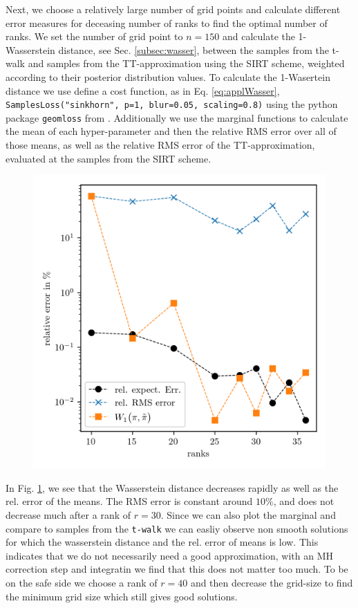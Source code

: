 Next, we choose a relatively large number of grid points and calculate different error measures for deceasing number of ranks to find the optimal number of ranks.
We set the number of grid point to $n = 150$ and calculate the 1-Wasserstein distance, see Sec. \ref{subsec:wasser}, between the samples from the t-walk and samples from the TT-approximation using the SIRT scheme, weighted according to their posterior distribution values.  
To calculate the 1-Wasertein distance we use define a cost function, as in Eq. \ref{eq:applWasser}, \texttt{SamplesLoss("sinkhorn", p=1, blur=0.05, scaling=0.8)} using the python package \texttt{geomloss} from \cite{feydy2020OT}.
Additionally we use the marginal functions to calculate the mean of each hyper-parameter and then the relative RMS error over all of those means, as well as the relative RMS error of the TT-approximation, evaluated at the samples from the SIRT scheme.

\begin{figure}[ht!]%
	\includegraphics[]{findRank.png}
	\caption[Find Ranks]{}
	\label{fig:FindRanks}
\end{figure}
In Fig. \ref{fig:FindRanks}, we see that the Wasserstein distance decreases rapidly as well as the rel. error of the means.
The RMS error is constant around $10\%$, and does not decrease much after a rank of $r = 30$.
Since we can also plot the marginal and compare to samples from the \texttt{t-walk} we can easliy observe non smooth solutions for which the wasserstein distance and the rel. error of means is low.
This indicates that we do not necessarily need a good approximation, with an MH correction step and integratin we find that this does not matter too much.
To be on the safe side we choose a rank of $r = 40$ and then decrease the grid-size to find the minimum grid size which still gives good solutions.

